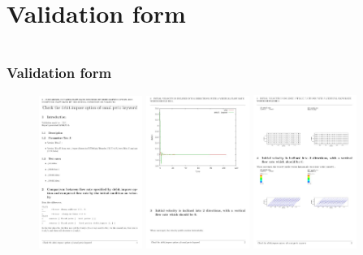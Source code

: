 \documentclass[10pt]{beamer}
\begin{document}
\section{Validation form}
\begin{frame}
\begin{columns}[c] 
\tableofcontents[sections={1-6},currentsection, currentsubsection]
\tableofcontents[sections={7-12},currentsection, currentsubsection]
\end{columns}
\end{frame}
\begin{frame}
\frametitle{Validation form}
\begin{block}{}

\begin{figure}
\includegraphics[width=0.3\textwidth]{PICTURES/valid1.jpg}
\includegraphics[width=0.3\textwidth]{PICTURES/valid2.jpg}
\includegraphics[width=0.3\textwidth]{PICTURES/valid3.jpg}
\end{figure}

\end{block}
\end{frame}
\end{document}
